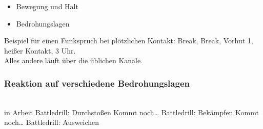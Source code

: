	\begin{itemize}
		\item Bewegung und Halt 
		\item Bedrohungslagen
	\end{itemize}

	Beispiel für einen Funkspruch bei plötzlichen Kontakt: Break, Break, Vorhut 1, heißer Kontakt, 3 Uhr. \\
	Alles andere läuft über die üblichen Kanäle. \\

\subsubsection{Reaktion auf verschiedene Bedrohungslagen} \ \\
in Arbeit
Battledrill: Durchstoßen
Kommt noch…
Battledrill: Bekämpfen
Kommt noch…
Battledrill: Ausweichen

